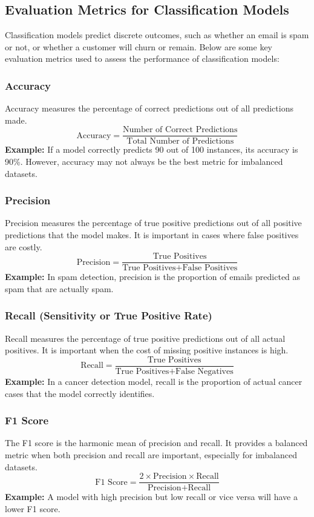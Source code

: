 \documentclass[11pt,spanish]{article}
\begin{document}
\begin{multicols}{2}
\subsection{Evaluation Metrics for Classification Models}
Classification models predict discrete outcomes, such as whether an email is spam or not, or whether a customer will churn or remain. Below are some key evaluation metrics used to assess the performance of classification models:

\subsubsection{Accuracy}
Accuracy measures the percentage of correct predictions out of all predictions made.
\[
\text{Accuracy} = \frac{\text{Number of Correct Predictions}}{\text{Total Number of Predictions}}
\]
\textbf{Example:} If a model correctly predicts 90 out of 100 instances, its accuracy is 90\%. However, accuracy may not always be the best metric for imbalanced datasets.

\subsubsection{Precision}
Precision measures the percentage of true positive predictions out of all positive predictions that the model makes. It is important in cases where false positives are costly.
\[
\text{Precision} = \frac{\text{True Positives}}{\text{True Positives} + \text{False Positives}}
\]
\textbf{Example:} In spam detection, precision is the proportion of emails predicted as spam that are actually spam.

\subsubsection{Recall (Sensitivity or True Positive Rate)}
Recall measures the percentage of true positive predictions out of all actual positives. It is important when the cost of missing positive instances is high.
\[
\text{Recall} = \frac{\text{True Positives}}{\text{True Positives} + \text{False Negatives}}
\]
\textbf{Example:} In a cancer detection model, recall is the proportion of actual cancer cases that the model correctly identifies.

\subsubsection{F1 Score}
The F1 score is the harmonic mean of precision and recall. It provides a balanced metric when both precision and recall are important, especially for imbalanced datasets.
\[
\text{F1 Score} = \frac{2 \times \text{Precision} \times \text{Recall}}{\text{Precision} + \text{Recall}}
\]
\textbf{Example:} A model with high precision but low recall or vice versa will have a lower F1 score.


\end{multicols}
\end{document}
